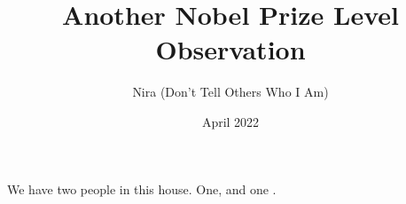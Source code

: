 \documentclass{article}
\title{Another Nobel Prize Level Observation}
\author{Nira (Don't Tell Others Who I Am)}
\date{April 2022}
\begin{document}
\maketitle
We have two people in this house. One,  and one .
\end{document}
